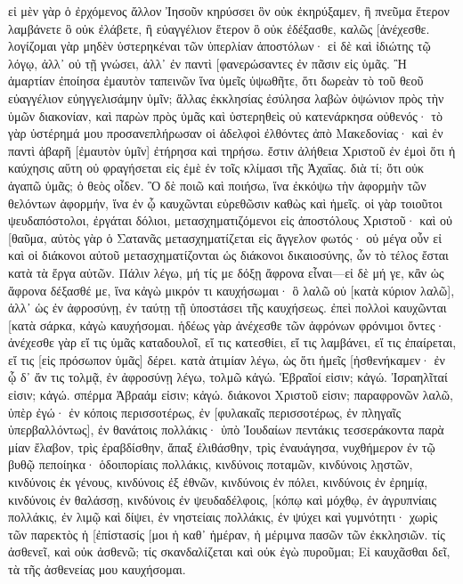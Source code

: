 εἰ μὲν γὰρ ὁ ἐρχόμενος ἄλλον Ἰησοῦν κηρύσσει ὃν οὐκ ἐκηρύξαμεν, ἢ πνεῦμα ἕτερον λαμβάνετε ὃ οὐκ ἐλάβετε, ἢ εὐαγγέλιον ἕτερον ὃ οὐκ ἐδέξασθε, καλῶς [ἀνέχεσθε. 
λογίζομαι γὰρ μηδὲν ὑστερηκέναι τῶν ὑπερλίαν ἀποστόλων· 
εἰ δὲ καὶ ἰδιώτης τῷ λόγῳ, ἀλλ᾽ οὐ τῇ γνώσει, ἀλλ᾽ ἐν παντὶ [φανερώσαντες ἐν πᾶσιν εἰς ὑμᾶς. 
Ἢ ἁμαρτίαν ἐποίησα ἐμαυτὸν ταπεινῶν ἵνα ὑμεῖς ὑψωθῆτε, ὅτι δωρεὰν τὸ τοῦ θεοῦ εὐαγγέλιον εὐηγγελισάμην ὑμῖν; 
ἄλλας ἐκκλησίας ἐσύλησα λαβὼν ὀψώνιον πρὸς τὴν ὑμῶν διακονίαν, 
καὶ παρὼν πρὸς ὑμᾶς καὶ ὑστερηθεὶς οὐ κατενάρκησα οὐθενός· τὸ γὰρ ὑστέρημά μου προσανεπλήρωσαν οἱ ἀδελφοὶ ἐλθόντες ἀπὸ Μακεδονίας· καὶ ἐν παντὶ ἀβαρῆ [ἐμαυτὸν ὑμῖν] ἐτήρησα καὶ τηρήσω. 
ἔστιν ἀλήθεια Χριστοῦ ἐν ἐμοὶ ὅτι ἡ καύχησις αὕτη οὐ φραγήσεται εἰς ἐμὲ ἐν τοῖς κλίμασι τῆς Ἀχαΐας. 
διὰ τί; ὅτι οὐκ ἀγαπῶ ὑμᾶς; ὁ θεὸς οἶδεν. 
Ὃ δὲ ποιῶ καὶ ποιήσω, ἵνα ἐκκόψω τὴν ἀφορμὴν τῶν θελόντων ἀφορμήν, ἵνα ἐν ᾧ καυχῶνται εὑρεθῶσιν καθὼς καὶ ἡμεῖς. 
οἱ γὰρ τοιοῦτοι ψευδαπόστολοι, ἐργάται δόλιοι, μετασχηματιζόμενοι εἰς ἀποστόλους Χριστοῦ· 
καὶ οὐ [θαῦμα, αὐτὸς γὰρ ὁ Σατανᾶς μετασχηματίζεται εἰς ἄγγελον φωτός· 
οὐ μέγα οὖν εἰ καὶ οἱ διάκονοι αὐτοῦ μετασχηματίζονται ὡς διάκονοι δικαιοσύνης, ὧν τὸ τέλος ἔσται κατὰ τὰ ἔργα αὐτῶν. 
Πάλιν λέγω, μή τίς με δόξῃ ἄφρονα εἶναι—εἰ δὲ μή γε, κἂν ὡς ἄφρονα δέξασθέ με, ἵνα κἀγὼ μικρόν τι καυχήσωμαι· 
ὃ λαλῶ οὐ [κατὰ κύριον λαλῶ], ἀλλ᾽ ὡς ἐν ἀφροσύνῃ, ἐν ταύτῃ τῇ ὑποστάσει τῆς καυχήσεως. 
ἐπεὶ πολλοὶ καυχῶνται [κατὰ σάρκα, κἀγὼ καυχήσομαι. 
ἡδέως γὰρ ἀνέχεσθε τῶν ἀφρόνων φρόνιμοι ὄντες· 
ἀνέχεσθε γὰρ εἴ τις ὑμᾶς καταδουλοῖ, εἴ τις κατεσθίει, εἴ τις λαμβάνει, εἴ τις ἐπαίρεται, εἴ τις [εἰς πρόσωπον ὑμᾶς] δέρει. 
κατὰ ἀτιμίαν λέγω, ὡς ὅτι ἡμεῖς [ἠσθενήκαμεν· ἐν ᾧ δ᾽ ἄν τις τολμᾷ, ἐν ἀφροσύνῃ λέγω, τολμῶ κἀγώ. 
Ἑβραῖοί εἰσιν; κἀγώ. Ἰσραηλῖταί εἰσιν; κἀγώ. σπέρμα Ἀβραάμ εἰσιν; κἀγώ. 
διάκονοι Χριστοῦ εἰσιν; παραφρονῶν λαλῶ, ὑπὲρ ἐγώ· ἐν κόποις περισσοτέρως, ἐν [φυλακαῖς περισσοτέρως, ἐν πληγαῖς ὑπερβαλλόντως], ἐν θανάτοις πολλάκις· 
ὑπὸ Ἰουδαίων πεντάκις τεσσεράκοντα παρὰ μίαν ἔλαβον, 
τρὶς ἐραβδίσθην, ἅπαξ ἐλιθάσθην, τρὶς ἐναυάγησα, νυχθήμερον ἐν τῷ βυθῷ πεποίηκα· 
ὁδοιπορίαις πολλάκις, κινδύνοις ποταμῶν, κινδύνοις λῃστῶν, κινδύνοις ἐκ γένους, κινδύνοις ἐξ ἐθνῶν, κινδύνοις ἐν πόλει, κινδύνοις ἐν ἐρημίᾳ, κινδύνοις ἐν θαλάσσῃ, κινδύνοις ἐν ψευδαδέλφοις, 
[κόπῳ καὶ μόχθῳ, ἐν ἀγρυπνίαις πολλάκις, ἐν λιμῷ καὶ δίψει, ἐν νηστείαις πολλάκις, ἐν ψύχει καὶ γυμνότητι· 
χωρὶς τῶν παρεκτὸς ἡ [ἐπίστασίς [μοι ἡ καθ᾽ ἡμέραν, ἡ μέριμνα πασῶν τῶν ἐκκλησιῶν. 
τίς ἀσθενεῖ, καὶ οὐκ ἀσθενῶ; τίς σκανδαλίζεται καὶ οὐκ ἐγὼ πυροῦμαι; 
Εἰ καυχᾶσθαι δεῖ, τὰ τῆς ἀσθενείας μου καυχήσομαι. 
